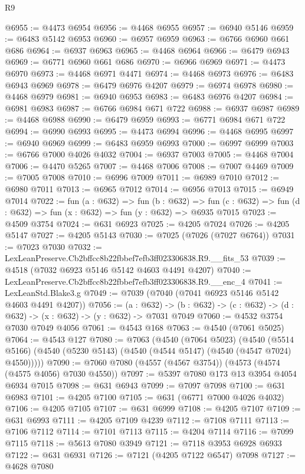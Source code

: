 \begin{lexlean}{R9}
\begin{coremodule}
@6955 := @4473 @6954
@6956 := @4468 @6955
@6957 := @6940 @5146
@6959 := @6483 @5142 @6953
@6960 := @6957 @6959
@6963 := @6766 @6960 @661 @686
@6964 := @6937 @6963
@6965 := @4468 @6964
@6966 := @6479 @6943
@6969 := @6771 @6960 @661 @686
@6970 := @6966 @6969
@6971 := @4473 @6970
@6973 := @4468 @6971 @4471
@6974 := @4468 @6973
@6976 := @6483 @6943 @6969
@6978 := @6479 @6976 @4207
@6979 := @6974 @6978
@6980 := @4468 @6979
@6981 := @6940 @6953
@6983 := @6483 @6976 @4207
@6984 := @6981 @6983
@6987 := @6766 @6984 @671 @722
@6988 := @6937 @6987
@6989 := @4468 @6988
@6990 := @6479 @6959
@6993 := @6771 @6984 @671 @722
@6994 := @6990 @6993
@6995 := @4473 @6994
@6996 := @4468 @6995
@6997 := @6940 @6969
@6999 := @6483 @6959 @6993
@7000 := @6997 @6999
@7003 := @6766 @7000 @4026 @4032
@7004 := @6937 @7003
@7005 := @4468 @7004
@7006 := @4470 @5265
@7007 := @4468 @7006
@7008 := @7007 @4469
@7009 := @7005 @7008
@7010 := @6996 @7009
@7011 := @6989 @7010
@7012 := @6980 @7011
@7013 := @6965 @7012
@7014 := @6956 @7013
@7015 := @6949 @7014
@7022 := fun (a : @632) =>
  fun (b : @632) =>
  fun (c : @632) => fun (d : @632) => fun (x : @632) => fun (y : @632) => @6935 @7015
@7023 := @4509 @3754
@7024 := @631 @6923
@7025 := @4205 @7024
@7026 := @4205 @5147
@7027 := @4205 @5143
@7030 := @7025 (@7026 (@7027 @6764))
@7031 := @7023 @7030
@7032 := LexLeanPreserve.Cb2bffcc8b22fbbef7efb3ff023306838.R9.__fits_53
@7039 := @4518 (@7032 @6923 @5146 @5142 @4603 @4491 @4207)
@7040 := LexLeanPreserve.Cb2bffcc8b22fbbef7efb3ff023306838.R9.__enc_4
@7041 := LexLeanStd.Blake3.g
@7049 := @7039 (@7040 (@7041 @6923 @5146 @5142 @4603 @4491 @4207))
@7056 := (a : @632) ->
  (b : @632) -> (c : @632) -> (d : @632) -> (x : @632) -> (y : @632) -> @7031 @7049
@7060 := @4532 @3754 @7030 @7049 @4056
@7061 := @4543 @168
@7063 := @4540 (@7061 @5025)
@7064 := @4543 @127
@7080 := @7063
    (@4540
      (@7064 @5023)
      (@4540 (@5514 @5166) (@4540 (@5230 @5143) (@4540 (@4544 @5147) (@4540 (@4547 @7024) @4550)))))
@7090 := @7060 @7080 (@4557 (@4567 @3754)) (@4573 (@4574 (@4575 @4056) @7030 @4550))
@7097 := @5397 @7080 @173 @13 @3954 @4054 @6934 @7015
@7098 := @631 @6943
@7099 := @7097 @7098
@7100 := @631 @6983
@7101 := @4205 @7100
@7105 := @631 (@6771 @7000 @4026 @4032)
@7106 := @4205 @7105
@7107 := @631 @6999
@7108 := @4205 @7107
@7109 := @631 @6993
@7111 := @4205 @7109 @4239
@7112 := @7108 @7111
@7113 := @7106 @7112
@7114 := @7101 @7113
@7115 := @4204 @7114
@7116 := @7099 @7115
@7118 := @5613 @7080 @3949
@7121 := @7118 @3953 @6928 @6933
@7122 := @631 @6931
@7126 := @7121 (@4205 @7122 @6547) @7098
@7127 := @4628 @7080

\end{coremodule}
\end{lexlean}
